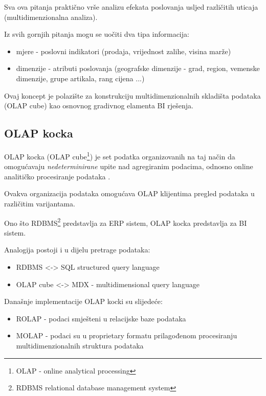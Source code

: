 \documentclass[times, utf8, seminar]{fit}
\begin{document}
Sva ova pitanja praktično vrše analizu efekata poslovanja usljed različitih uticaja (multidimenzionalna analiza).

Iz svih gornjih pitanja mogu se uočiti dva tipa informacija:

\begin{itemize}
   \item mjere - poslovni indikatori (prodaja, vrijednost zalihe, visina marže)
   \item dimenzije - atributi poslovanja (geografske dimenzije - grad, region, vemenske dimenzije, grupe artikala, rang cijena ...)
\end{itemize}

Ovaj koncept je polazište za konstrukciju multidimenzionalnih skladišta podataka (OLAP cube) kao osnovnog gradivnog elamenta BI rješenja.
 
\subsection{OLAP kocka}

OLAP kocka  (OLAP cube\footnote{OLAP - online analytical processing}) je set podatka organizovanih na taj način da omogućavaju \emph{nedeterminirane} upite nad agregiranim podacima, odnosno online analitičko procesiranje podataka \cite{web:wikipedia:olap_cube}.

Ovakva organizacija podataka omogućava OLAP klijentima pregled podataka u različitim varijantama.

Ono što RDBMS\footnote{RDBMS relational database management system} predstavlja za ERP sistem, OLAP kocka predstavlja za BI sistem.

Analogija postoji i u dijelu pretrage podataka:

\begin{itemize}
 \item RDBMS <-> SQL structured query language
 \item OLAP cube <-> MDX - multidimensional query language
\end{itemize}

Današnje implementacije OLAP kocki su slijedeće:

\begin{itemize}
  \item ROLAP - podaci smješteni u relacijske baze podataka
  \item MOLAP - podaci su u proprietary formatu prilagođenom procesiranju multidimenzionalnih struktura podataka
\end{itemize}
\end{document}
